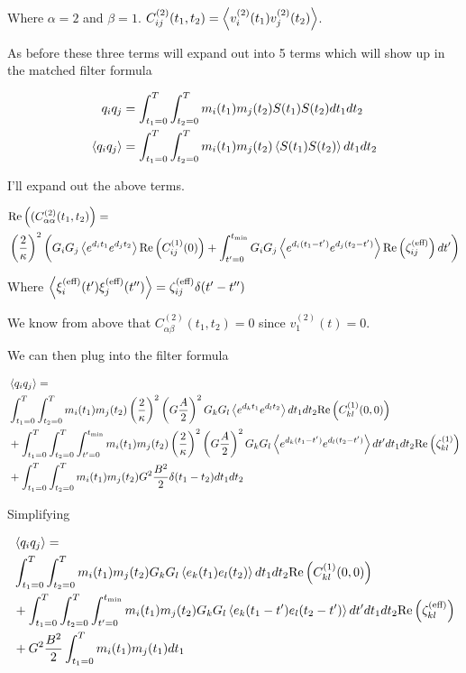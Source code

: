 \documentclass[12pt]{article}
\begin{document}
Where $\alpha=2$ and $\beta = 1$. $C^{(2)}_{ij}(t_1,t_2) = \Braket{v^{(2)}_i(t_1)v^{(2)}_j(t_2)}$.

As before these three terms will expand out into 5 terms which will show up in the matched filter formula

\begin{align}
q_iq_j &= \int_{t_1=0}^T \int_{t_2=0}^T m_i(t_1)m_j(t_2) S(t_1)S(t_2) dt_1 dt_2\\
\Braket{q_iq_j} &= \int_{t_1=0}^T \int_{t_2=0}^T m_i(t_1)m_j(t_2) \Braket{S(t_1)S(t_2)} dt_1 dt_2\\
\end{align}

I'll expand out the above terms.

\begin{align}
&\text{Re}\left((C^{(2)}_{\alpha \alpha}(t_1,t_2)\right) =\\ &\left(\frac{2}{\kappa}\right)^2\left(G_i G_j \Braket{e^{d_{i} t_1} e^{d_j t_2}} \text{Re}\left(C^{(1)}_{ij}(0)\right)  + \int_{t'=0}^{t_{\text{min}}} G_i G_j \Braket{e^{d_{i} (t_1-t')} e^{d_j (t_2-t')}} \text{Re}\left(\zeta^{(\text{eff})}_{ij}\right) dt' \right)
\end{align}

Where $\Braket{\xi^{(\text{eff})}_i(t')\xi^{(\text{eff})}_j(t'')} = \zeta^{(\text{eff})}_{ij} \delta(t'-t'')$

We know from above that $C^{(2)}_{\alpha \beta}(t_1,t_2) = 0$ since $v^{(2)}_1(t) = 0$.

We can then plug into the filter formula

\begin{align}
&\Braket{q_i q_j} =\\
&\int_{t_1=0}^T \int_{t_2 = 0}^T m_i(t_1)m_j(t_2) \left(\frac{2}{\kappa}\right)^2\left(G\frac{A}{2}\right)^2 G_k G_l \Braket{e^{d_k t_1} e^{d_l t_2}} dt_1 dt_2 \text{Re}\left(C^{(1)}_{kl}(0,0)\right)\\
&+\int_{t_1=0}^T \int_{t_2=0}^T \int_{t'=0}^{t_{\text{min}}} m_i(t_1)m_j(t_2) \left(\frac{2}{\kappa}\right)^2\left(G\frac{A}{2}\right)^2 G_k G_l \Braket{e^{d_k (t_1-t')} e^{d_l (t_2-t')}} dt' dt_1 dt_2 \text{Re}\left(\zeta^{(1)}_{kl}\right)\\
&+\int_{t_1=0}^T \int_{t_2=0}^T m_i(t_1) m_j(t_2) G^2 \frac{B^2}{2} \delta(t_1-t_2)dt_1 dt_2
\end{align}

Simplifying

\begin{align}
&\Braket{q_i q_j} =\\
&\int_{t_1=0}^T \int_{t_2=0}^T m_i(t_1) m_j(t_2) G_k G_l \Braket{e_k(t_1) e_l(t_2)} dt_1 dt_2 \text{Re}\left(C^{(1)}_{kl}(0,0)\right)\\
&+\int_{t_1=0}^T \int_{t_2=0}^T \int_{t'=0}^{t_{\text{min}}} m_i(t_1) m_j(t_2) G_k G_l \Braket{e_k(t_1-t')e_l(t_2-t')} dt' dt_1 dt_2 \text{Re}\left(\zeta^{(\text{eff})}_{kl}\right)\\
&+ G^2\frac{B^2}{2}\int_{t_1=0}^T m_i(t_1)m_j(t_1) dt_1
\end{align}
\end{document}
